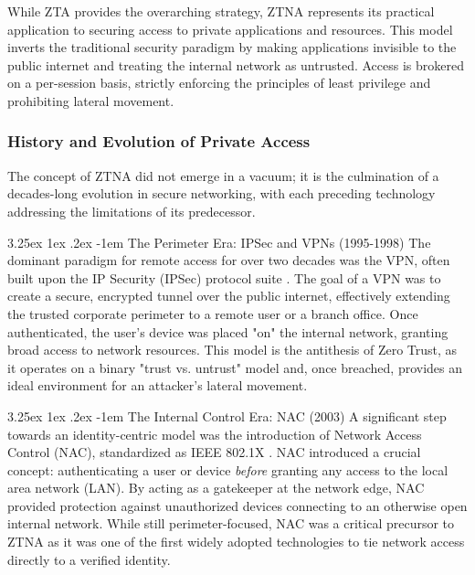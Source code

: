 \documentclass[12pt, a4paper, reqno, oneside]{book}
\makeatletter
\renewcommand\paragraph{\@startsection{paragraph}{5}{\z@}%
  {3.25ex \@plus1ex \@minus.2ex}%
  {-1em}%
  {\normalfont\normalsize\bfseries}}
\makeatother
\begin{document}
While ZTA provides the overarching strategy, ZTNA represents its practical application to securing access to private applications and resources. 
This model inverts the traditional security paradigm by making applications invisible to the public internet and treating the internal network as untrusted. Access is brokered on a per-session basis, strictly enforcing the principles of least privilege and prohibiting lateral movement.

\subsubsection{History and Evolution of Private Access}
\label{sec:ztna_history}

The concept of ZTNA did not emerge in a vacuum; it is the culmination of a decades-long evolution in secure networking, with each preceding technology addressing the limitations of its predecessor.

\paragraph{The Perimeter Era: IPSec and VPNs (1995-1998)}
The dominant paradigm for remote access for over two decades was the VPN, often built upon the IP Security (IPSec) protocol suite \cite{rfc2401}. The goal of a VPN was to create a secure, encrypted tunnel over the public internet, effectively extending the trusted corporate perimeter to a remote user or a branch office. Once authenticated, the user's device was placed "on" the internal network, granting broad access to network resources. This model is the antithesis of Zero Trust, as it operates on a binary "trust vs. untrust" model and, once breached, provides an ideal environment for an attacker's lateral movement.

\paragraph{The Internal Control Era: NAC (2003)}
A significant step towards an identity-centric model was the introduction of Network Access Control (NAC), standardized as IEEE 802.1X \cite{ieee8021x}. NAC introduced a crucial concept: authenticating a user or device \textit{before} granting any access to the local area network (LAN). By acting as a gatekeeper at the network edge, NAC provided protection against unauthorized devices connecting to an otherwise open internal network. While still perimeter-focused, NAC was a critical precursor to ZTNA as it was one of the first widely adopted technologies to tie network access directly to a verified identity.
\end{document}
